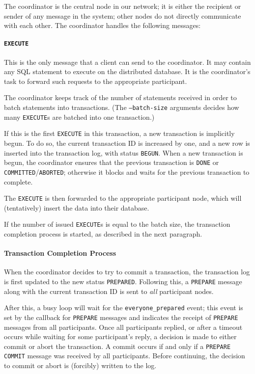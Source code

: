 \documentclass{article}
\begin{document}
\begin{multicols}{2}
The coordinator is the central node in our network; it is
either the recipient or sender of any message in the
system; other nodes do not directly communicate with each
other. The coordinator handles the following messages:

\paragraph{\texttt{EXECUTE}} 
This is the only message that a client can send to the
coordinator. It may contain any SQL statement to execute
on the distributed database. It is the coordinator's task
to forward  such requests to the appropriate participant.

The coordinator keeps track of the number of statements
received in order to batch statements into transactions. 
(The \texttt{--batch-size} arguments decides how many 
\texttt{EXECUTE}s are batched into one transaction.)

If this is the first \texttt{EXECUTE} in this transaction,
a new transaction is implicitly begun. To do so,
the current transaction ID is increased by one, and a new
row is inserted into the transaction log, with status 
\texttt{BEGUN}. When a new transaction is begun, the
coordinator ensures that the previous transaction is
\texttt{DONE} or \texttt{COMMITTED}/\texttt{ABORTED};
otherwise it blocks and waits for the previous transaction
to complete.

The \texttt{EXECUTE} is then forwarded to the appropriate
participant node, which will (tentatively) insert the data
into their database.

If the number of issued \texttt{EXECUTE}s is
equal to the batch size, the transaction completion process
is started, as described in the next paragraph.

\paragraph{Transaction Completion Process}

When the coordinator decides to try to commit a
transaction, the transaction log is first updated to the
new status \texttt{PREPARED}. Following this, a
\texttt{PREPARE} message along with the current transaction
ID is sent to \textit{all} participant nodes.

After this, a busy loop will wait for
the \texttt{everyone\_prepared} event; this event is set by
the callback for \texttt{PREPARE} messages and indicates 
the receipt of \texttt{PREPARE} messages from all 
participants. Once all participants replied, or after a
timeout occurs while waiting for some participant's reply,
a decision is made to either commit or abort the
transaction. A commit occurs if and only if a 
\texttt{PREPARE COMMIT} message was received by all
participants. Before continuing, the decision to commit or
abort is (forcibly) written to the log.


\end{multicols}
\end{document}
